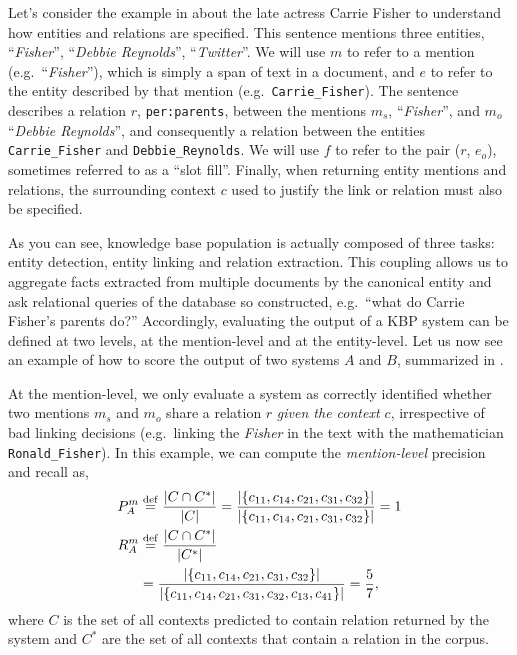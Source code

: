 Let's consider the example in  about the late actress Carrie Fisher to understand how entities and relations are specified. 
This sentence mentions three entities,
  ``\textit{Fisher}'',
  ``\textit{Debbie Reynolds}'',
  ``\textit{Twitter}''.
We will use $m$ to refer to a mention (e.g.\ ``\textit{Fisher}''), which is simply a span of text in a document, and $e$ to refer to the entity described by that mention (e.g.\ \texttt{Carrie\_Fisher}).
The sentence describes a relation $r$, \texttt{per:parents}, between the mentions $m_s$, ``\textit{Fisher}'', and $m_o$ ``\textit{Debbie Reynolds}'', and consequently a relation between the entities \texttt{Carrie\_Fisher} and \texttt{Debbie\_Reynolds}.
We will use $f$ to refer to the pair ($r$, $e_o$), sometimes referred to as a ``slot fill''.
Finally, when returning entity mentions and relations, the surrounding context $c$ used to justify the link or relation must also be specified.

As you can see, knowledge base population is actually composed of three tasks: entity detection, entity linking and relation extraction.
This coupling allows us to aggregate facts extracted from multiple documents by the canonical entity and ask relational queries of the database so constructed, e.g.\ ``what do Carrie Fisher's parents do?''
Accordingly, evaluating the output of a KBP system can be defined at two levels, at the mention-level and at the entity-level.
Let us now see an example of how to score the output of two systems $A$ and $B$, summarized in .

At the mention-level, we only evaluate a system as correctly identified whether two mentions $m_s$ and $m_o$ share a relation $r$ \textit{given the context $c$}, irrespective of bad linking decisions (e.g.\ linking the \textit{Fisher} in the text with the mathematician \texttt{Ronald\_Fisher}).
In this example, we can compute the \textit{mention-level} precision and recall as,
\begin{align*}
  P^m_A &\stackrel{\rm def}{=} \frac{|C \cap C^*|}{|C|} = \frac{|\{c_{11}, c_{14}, c_{21}, c_{31}, c_{32}\}|}{|\{c_{11}, c_{14}, c_{21}, c_{31}, c_{32}\}|} = 1 \\
  R^m_A &\stackrel{\rm def}{=} \frac{|C \cap C^*|}{|C^*|}\\
  &= \frac{|\{c_{11}, c_{14}, c_{21}, c_{31}, c_{32}\}|}{|\{c_{11}, c_{14}, c_{21}, c_{31}, c_{32}, c_{13}, {c_{41}}\}|} = \frac{5}{7},
\end{align*}
where $C$ is the set of all contexts predicted to contain relation returned by the system and $C^*$ are the set of all contexts that contain a relation in the corpus.

